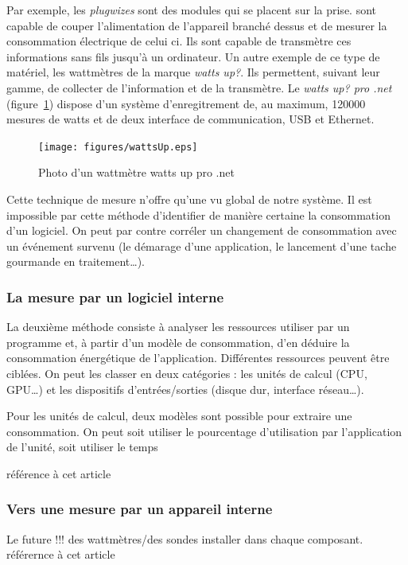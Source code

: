 \documentclass[a4paper, 11pt]{report}
\begin{document}
Par exemple, les \textit{plugwizes} sont des modules qui se placent sur la prise. sont capable de couper l'alimentation de l'appareil branché dessus et de mesurer la consommation électrique de celui ci. Ils sont capable de transmètre ces informations sans fils jusqu'à un ordinateur. Un autre exemple de ce type de matériel, les wattmètres de la marque \textit{watts up\/?}. Ils permettent, suivant leur gamme, de collecter de l'information et de la transmètre. Le \textit{watts up\/? pro .net} (figure~\ref{wattsUp}) dispose d'un système d'enregitrement de, au maximum, 120000 mesures de watts et de deux interface de communication, USB et Ethernet.

\begin{figure}
	\begin{center}
		\texttt{[image: figures/wattsUp.eps]}
		\caption{Photo d'un wattmètre watts up pro .net}
		\label{wattsUp}
	\end{center}
\end{figure}

Cette technique de mesure n'offre qu'une vu global de notre système. Il est impossible par cette méthode d'identifier de manière certaine la consommation d'un logiciel. On peut par contre corréler un changement de consommation avec un événement survenu (le démarage d'une application, le lancement d'une tache gourmande en traitement\ldots). 

			\subsubsection{La mesure par un logiciel interne}
La deuxième méthode consiste à analyser les ressources utiliser par un programme et, à partir d'un modèle de consommation, d'en déduire la consommation énergétique de l'application. Différentes ressources peuvent être ciblées. On peut les classer en deux catégories : les unités de calcul (CPU, GPU\ldots) et les dispositifs d'entrées/sorties (disque dur, interface réseau\ldots).

Pour les unités de calcul, deux modèles sont possible pour extraire une consommation. On peut soit utiliser le pourcentage d'utilisation par l'application de l'unité, soit utiliser le temps 

référence à cet article \cite{noureddine:hal-00681560}

			\subsubsection{Vers une mesure par un appareil interne}
Le future !!! des wattmètres/des sondes installer dans chaque composant. référernce à cet article\cite{Esmaeilzadeh:2011:LBL:1950365.1950402}
		
\end{document}
